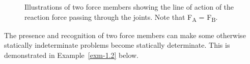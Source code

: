 \documentclass[
  letterpaper,
  DIV=11,
  numbers=noendperiod]{scrreprt}
\theoremstyle{definition}
\theoremstyle{remark}
\begin{document}
\begin{figure}


\caption{\label{fig-1.1}Illustrations of two force members showing the
line of action of the reaction force passing through the joints. Note
that F\textsubscript{A} = F\textsubscript{B}.}

\end{figure}%

The presence and recognition of two force members can make some
otherwise statically indeterminate problems become statically
determinate. This is demonstrated in Example~\ref{exm-1.2} below.
\end{document}
